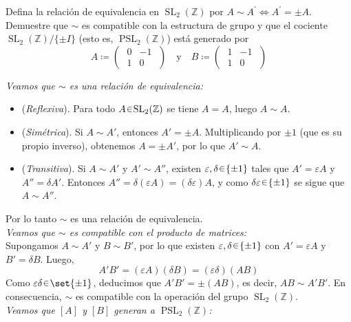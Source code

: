 \begin{ejer}
Defina la relación de equivalencia en $\operatorname{SL}_{2}(\mathbb{Z})$ por $A \sim A^{\prime} \iff A^{\prime}=\pm A$. Demuestre que $\sim$ es compatible con la estructura de grupo y que el cociente $\operatorname{SL}_{2}(\mathbb{Z})/\{\pm I\}$ (esto es, $\operatorname{PSL}_{2}(\mathbb{Z})$) está generado por 
\[
A \coloneq \left(\;\begin{matrix}0 & -1 \\ 1 & 0\end{matrix}\;\right)%
\quad\text{y}\quad%
B \coloneq \left(\;\begin{matrix}1 & -1 \\ 1 & 0\end{matrix}\;\right)
\]
\end{ejer}
\begin{sol}[Demostración]%
\emph{Veamos que $\sim$ es una relación de equivalencia:}
\begin{itemize}
  \item(\emph{Reflexiva}). Para todo $A\en \operatorname{SL}_2(\mathbb{Z})$ se tiene $A=A$, luego $A\sim A$.
  \item(\emph{Simétrica}). Si $A\sim A'$, entonces $A'=\pm A$. Multiplicando por $\pm1$ (que es su propio inverso), obtenemos $A=\pm A'$, por lo que $A'\sim A$.
  \item(\emph{Transitiva}). Si $A\sim A'$ y $A'\sim A''$, existen $\varepsilon,\delta\en\{\pm1\}$ tales que $A'=\varepsilon A$ y $A''=\delta A'$. Entonces
  $A''=\delta(\varepsilon A)=(\delta\varepsilon)A$,
  y como $\delta\varepsilon\en\{\pm1\}$ se sigue que $A\sim A''$.
\end{itemize}
Por lo tanto $\sim$ es una relación de equivalencia.\vspace{1em}\\
\emph{Veamos que $\sim$ es compatible con el producto de matrices:}\\
Supongamos $A\sim A'$ y $B\sim B'$, por lo que existen $\varepsilon,\delta\en\{\pm1\}$ con $A'=\varepsilon A$ y $B'=\delta B$.
Luego,
\[
A'B'=(\varepsilon A)(\delta B)=(\varepsilon\delta)(AB)
\]
Como $\varepsilon\delta\en\set{\pm1}$, deducimos que
$A'B'=\pm(AB)$,
es decir, $AB\sim A'B'$. En consecuencia, $\sim$ es compatible con la operación del grupo $\operatorname{SL}_2(\mathbb{Z})$.\vspace{1em}\\
\emph{Veamos que $[A]$ y $[B]$ generan a $\operatorname{PSL}_{2}(\mathbb{Z})$:}\\

\end{sol}
